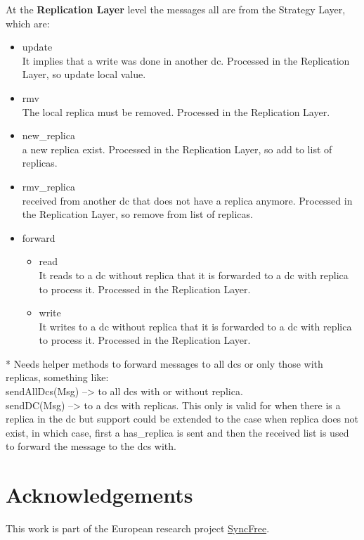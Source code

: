 \documentclass[english]{article}
\begin{document}
At the {\bf Replication Layer} level the messages all are from the Strategy Layer, which are:
\begin{itemize}
	\item \textcolor{msgTxt}{update}\\
		It implies that a write was done in another \gls{dc}. Processed in the Replication Layer, so update local value.
	\item \textcolor{msgTxt}{rmv}\\
		The local replica must be removed. Processed in the Replication Layer.
	\item \textcolor{msgTxt}{new\_replica}\\
		a new replica exist. Processed in the Replication Layer, so add to list of replicas.
	\item \textcolor{msgTxt}{rmv\_replica}\\
		received from another \gls{dc} that does not have a replica anymore. Processed in the Replication Layer, so remove from list of replicas.
	\item \textcolor{msgTxt}{forward}
		\begin{itemize}
			\item \textcolor{msgTxt}{read}\\
				It reads to a \gls{dc} without replica that it is forwarded to a \gls{dc} with replica to process it. Processed in the Replication Layer.
			\item \textcolor{msgTxt}{write}\\
				It writes to a \gls{dc} without replica that it is forwarded to a \gls{dc} with replica to process it. Processed in the Replication Layer.
		\end{itemize}
\end{itemize}

* Needs helper methods to forward messages to all \glspl{dc} or only those with replicas, something like:\\
sendAllDcs(Msg)	--> to all \glspl{dc} with or without replica.\\
sendDC(Msg)	--> to a \glspl{dc} with replicas. This only is valid for when there is a replica in the \gls{dc} but support could be extended to the case when replica does not exist, in which case, first a has\_replica is sent and then the received list is used to forward the message to the \glspl{dc} with.


\section{Acknowledgements}
This work is part of the European research project \href{https://syncfree.lip6.fr}{SyncFree}.


%

%
%


\printglossaries
\end{document}
